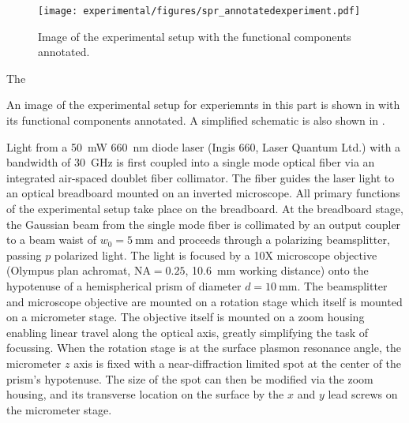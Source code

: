 \begin{figure}[ht]
 \centering
 \texttt{[image: experimental/figures/spr\_annotatedexperiment.pdf]}
 \caption{Image of the experimental setup with the functional
  components annotated.}
\label{fig:experimentalpicture}
\end{figure}

The 

An image of the experimental setup for experiemnts in this part is shown in
 with its functional components annotated.  A
simplified schematic is also shown in .

Light from a \SI{50}{\milli\watt} \SI{660}{\nano\meter} diode laser (Ingis
660, Laser Quantum Ltd.) with a bandwidth of \SI{30}{\giga\hertz} is first
coupled into a single mode optical fiber via an integrated air-spaced
doublet fiber collimator.  The fiber guides the laser light to an optical
breadboard mounted on an inverted microscope.  All primary functions of the
experimental setup take place on the breadboard.  At the breadboard stage,
the Gaussian beam from the single mode fiber is collimated by an output
coupler to a beam waist of $w_0=\SI{5}{\milli\meter}$ and proceeds through
a polarizing beamsplitter, passing $p$ polarized light.  The light is
focused by a 10X microscope objective (Olympus plan achromat,
$\mathrm{NA}=0.25$, \SI{10.6}{\milli\meter} working distance) onto the
hypotenuse of a hemispherical prism of diameter $d=\SI{10}{\milli\meter}$.
The beamsplitter and microscope objective are mounted on a rotation stage
which itself is mounted on a micrometer stage.  The objective itself is
mounted on a zoom housing enabling linear travel along the optical axis,
greatly simplifying the task of focussing.  When the rotation stage is at
the surface plasmon resonance angle, the micrometer $z$ axis is fixed with
a near-diffraction limited spot at the center of the prism's hypotenuse.
The size of the spot can then be modified via the zoom housing, and its
transverse location on the surface by the $x$ and $y$ lead screws on the
micrometer stage.  

